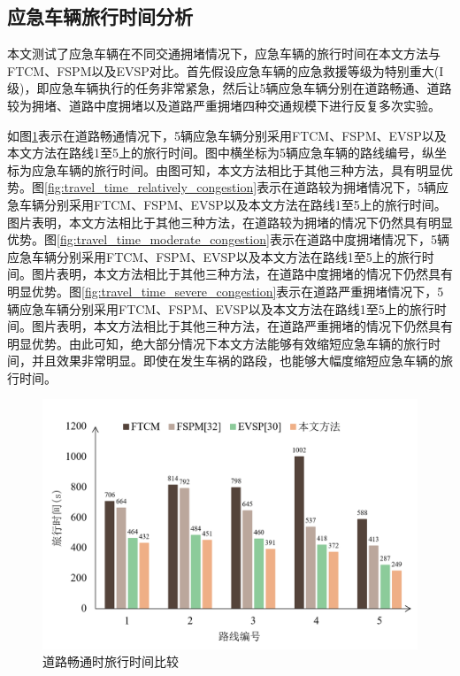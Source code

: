\subsection{应急车辆旅行时间分析}
本文测试了应急车辆在不同交通拥堵情况下，应急车辆的旅行时间在本文方法与FTCM、FSPM以及EVSP对比。首先假设应急车辆的应急救援等级为特别重大(I级)，即应急车辆执行的任务非常紧急，然后让5辆应急车辆分别在道路畅通、道路较为拥堵、道路中度拥堵以及道路严重拥堵四种交通规模下进行反复多次实验。

如图\ref{fig:travel_time_smooth}表示在道路畅通情况下，5辆应急车辆分别采用FTCM、FSPM、EVSP以及本文方法在路线1至5上的旅行时间。图中横坐标为5辆应急车辆的路线编号，纵坐标为应急车辆的旅行时间。由图可知，本文方法相比于其他三种方法，具有明显优势。图\ref{fig:travel_time_relatively_congestion}表示在道路较为拥堵情况下，5辆应急车辆分别采用FTCM、FSPM、EVSP以及本文方法在路线1至5上的旅行时间。图片表明，本文方法相比于其他三种方法，在道路较为拥堵的情况下仍然具有明显优势。图\ref{fig:travel_time_moderate_congestion}表示在道路中度拥堵情况下，5辆应急车辆分别采用FTCM、FSPM、EVSP以及本文方法在路线1至5上的旅行时间。图片表明，本文方法相比于其他三种方法，在道路中度拥堵的情况下仍然具有明显优势。图\ref{fig:travel_time_severe_congestion}表示在道路严重拥堵情况下，5辆应急车辆分别采用FTCM、FSPM、EVSP以及本文方法在路线1至5上的旅行时间。图片表明，本文方法相比于其他三种方法，在道路严重拥堵的情况下仍然具有明显优势。由此可知，绝大部分情况下本文方法能够有效缩短应急车辆的旅行时间，并且效果非常明显。即使在发生车祸的路段，也能够大幅度缩短应急车辆的旅行时间。

\begin{figure}[H]
	\centering
	\includegraphics[width=\linewidth]{figures/travel_time1.png}
	\caption{道路畅通时旅行时间比较}
	\label{fig:travel_time_smooth}
\end{figure}

